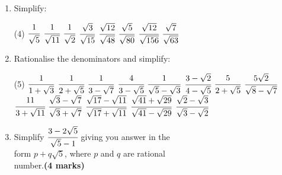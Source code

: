 \documentclass[fleqn, twoside]{article}
\begin{document}
\exercise{}
\begin{enumerate}
    \item Simplify:
        \begin{tasks}(4) %
            \task $\cfrac{1}{\sqrt{5}}$                  %
            \task $\cfrac{1}{\sqrt{11}}$                 %
            \task $\cfrac{1}{\sqrt{2}}$                  %
            \task $\cfrac{\sqrt{3}}{\sqrt{15}}$          %
            \task $\cfrac{\sqrt{12}}{\sqrt{48}}$         %
            \task $\cfrac{\sqrt{5}}{\sqrt{80}}$          %
            \task $\cfrac{\sqrt{12}}{\sqrt{156}}$        %
            \task $\cfrac{\sqrt{7}}{\sqrt{63}}$          %
        \end{tasks}
    \item Rationalise the denominators and simplify:
        \begin{tasks}(5) %
            \task $\cfrac{1}{1+\sqrt{3}}$                                %
            \task $\cfrac{1}{2+\sqrt{5}}$                                %
            \task $\cfrac{1}{3-\sqrt{7}}$                                %
            \task $\cfrac{4}{3-\sqrt{5}}$                                %
            \task $\cfrac{1}{\sqrt{5}-\sqrt{3}}$                         %
            \task $\cfrac{3-\sqrt{2}}{4-\sqrt{5}}$                       %
            \task $\cfrac{5}{2+\sqrt{5}}$                                %
            \task $\cfrac{5\sqrt{2}}{\sqrt{8}-\sqrt{7}}$                 %
            \task $\cfrac{11}{3+\sqrt{11}}$                              %
            \task $\cfrac{\sqrt{3}-\sqrt{7}}{\sqrt{3}+\sqrt{7}}$         %
            \task $\cfrac{\sqrt{17}-\sqrt{11}}{\sqrt{17}+\sqrt{11}}$     %
            \task $\cfrac{\sqrt{41}+\sqrt{29}}{\sqrt{41}-\sqrt{29}}$     %
            \task $\cfrac{\sqrt{2}-\sqrt{3}}{\sqrt{3}-\sqrt{2}}$         %
        \end{tasks}
    \setcounter{enumi}{3}
    \newpage
    \item Simplify $\cfrac{3-2\sqrt{5}}{\sqrt{5}-1}$     giving you answer in the    \\ %
          \indent form $p+q\sqrt{5}$, where $p$ and $q$ are rational                 \\
          number.\hspace*{40mm}\textbf{(4 marks)}\vspace{-4mm}                       \\
        \begin{table}[!ht]

\end{table}
\end{enumerate}
\end{document}
